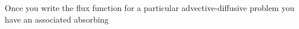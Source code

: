 

Once you write the flux function for a particular advective-diffusive
problem you have an associated absorbing 

